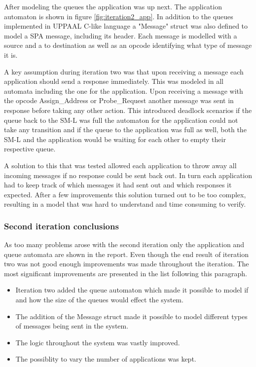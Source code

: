 After modeling the queues the application was up next. The application
automaton is shown in figure \ref{fig:iteration2_app}. In addition to the
queues implemented in UPPAAL C-like language a "Message" struct was also
defined to model a SPA message, including its header. Each message is modelled
with a source and a to destination as well as an opcode identifying what type
of message it is.

A key assumption during iteration two was that upon receiving a message each
application should send a response immediately. This was modeled in all
automata including the one for the application. Upon receiving a message with
the opcode Assign\_Address or Probe\_Request another message was sent in
response before taking any other action. This introduced deadlock scenarios if
the queue back to the SM-L was full the automaton for the application could not
take any transition and if the queue to the application was full as well, both
the SM-L and the application would be waiting for each other to empty their
respective queue.

A solution to this that was tested allowed each application to
throw away all incoming messages if no response could be sent back out. In turn
each application had to keep track of which messages it had sent out
and which responses it expected. After a few improvements this solution turned
out to be too complex, resulting in a model that was hard to understand and
time consuming to verify.

\subsubsection{Second iteration conclusions}
As too many problems arose with the second iteration only the application and
queue automata are shown in the report. Even though the end result of iteration
two was not good enough improvements was made throughout the iteration. The
most significant improvements are presented in the list following this
paragraph.

\begin{itemize}
    \item Iteration two added the queue automaton which made it possible to
        model if and how the size of the queues would effect the system.
    \item The addition of the Message struct made it possible to model
        different types of messages being sent in the system.
    \item The logic throughout the system was vastly improved.
    \item The possiblity to vary the number of applications was kept.
\end{itemize}

